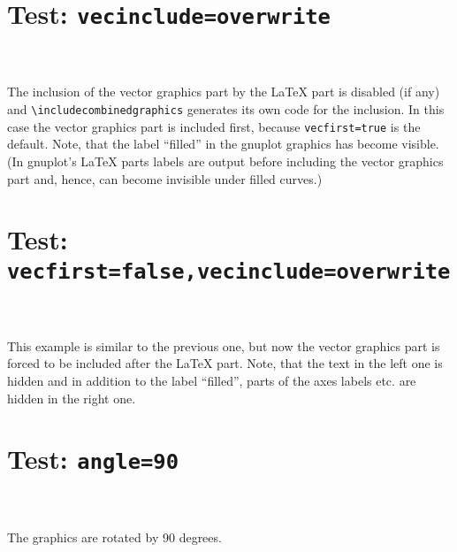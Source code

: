 \documentclass[DIV12]{scrartcl}
\newcommand*\combinput[1]{%
  \begin{picture}(0,0)%
    \texttt{[image: \#1]}%
  \end{picture}%
}
\begin{document}
  \section*{Test: \texttt{vecinclude=overwrite}}
  \noindent
  \fbox{\combinput{xfig325}}%
  \fbox{}\\[3ex]
  \\[3ex]
  The inclusion of the vector graphics part by the \LaTeX{} part is disabled
  (if any) and \texttt{\textbackslash includecombinedgraphics} generates its
  own code for the inclusion.  In this case the vector graphics part is included
  first, because \texttt{vecfirst=true} is the default.  Note, that the label
  ``filled'' in the gnuplot graphics has become visible.  (In gnuplot's
  \LaTeX{} parts labels are output before including the vector graphics part
  and, hence, can become invisible under filled curves.)

  \clearpage

  \section*{Test: \texttt{vecfirst=false,vecinclude=overwrite}}
  \noindent
  \fbox{\combinput{xfig325}}%
  \fbox{}\\[3ex]
  \\[3ex]
  This example is similar to the previous one, but now the vector graphics
  part is forced to be included after the \LaTeX{} part.  Note, that the text
  in the left one is hidden and in addition to the label ``filled'', parts
  of the axes labels etc. are hidden in the right one.

  \clearpage

  \section*{Test: \texttt{angle=90}}
  \noindent
  \fbox{\combinput{xfig325}}%
  \fbox{}\\[3ex]
  \\[3ex]
  The graphics are rotated by 90 degrees.
\end{document}
